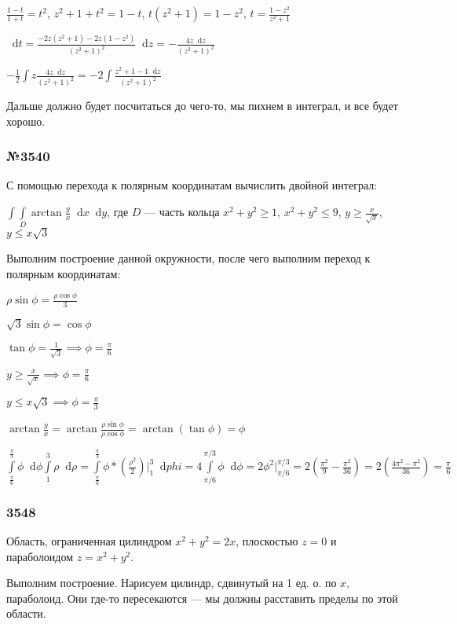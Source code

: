 \documentclass{article}
\newcommand*\diff{\mathop{}\!\mathrm{d}}
\begin{document}
$\frac{1-t}{1+t} = t^2$, $z^2 + 1 + t^2 = 1 - t$, $t(z^2 + 1) = 1 - z^2$, $t = \frac{1 - z^2}{z^2 + 1}$

$\diff t = \frac{-2z (z^2 + 1) - 2z (1 - z^2)}{(z^2 + 1)^2} \diff z = -\frac{4z \diff z}{(z^2 + 1)^2}$

$-\frac{1}{2} \int z \frac{4z \diff z}{(z^2+1)^2} = -2 \int \frac{z^2 + 1 -1 \diff z}{(z^2 + 1)^2}$

Дальше должно будет посчитаться до чего-то, мы пихнем в интеграл, и все будет хорошо.

\subsubsection{№3540}

С помощью перехода к полярным координатам вычислить двойной интеграл:

$\int\int\limits_{D} \arctan \frac{y}{x} \diff x \diff y$, где $D$ — часть кольца $x^2 + y^2 \ge 1$, $x^2 + y^2 \le 9$, $y \ge \frac{x}{\sqrt{x}}$, $y \le x\sqrt{3}$

Выполним построение данной окружности, после чего выполним переход к полярным координатам:

$\rho \sin \phi = \frac{\rho \cos \phi}{3}$

$\sqrt{3} \sin \phi = \cos \phi$

$\tan \phi = \frac{1}{\sqrt{3}} \implies \phi = \frac{\pi}{6}$

$y \ge \frac{x}{\sqrt{x}} \implies \phi = \frac{\pi}{6}$

$y \le x\sqrt{3} \implies \phi = \frac{\pi}{3}$

$\arctan \frac{y}{x} = \arctan \frac{\rho \sin \phi}{\rho \cos \phi} = \arctan (\tan \phi) = \phi$

$\int\limits_{\frac{\pi}{6}}^{\frac{\pi}{3}} \phi \diff \phi \int\limits_{1}^{3} \rho \diff \rho =
\int\limits_{\frac{\pi}{6}}^{\frac{\pi}{3}} \phi * (\frac{\rho^2}{2}) \bigg|_{1}^{3} \diff phi = 4 \int\limits_{\pi/6}^{\pi/3} \phi \diff \phi = 2 \phi^2 \bigg|_{\pi/6}^{\pi/3} = 2 (\frac{\pi^2}{9} - \frac{\pi^2}{36}) = 2 (\frac{4\pi^2 - \pi^2}{36}) = \frac{\pi}{6}$

\subsubsection{3548}

Область, ограниченная цилиндром $x^2+y^2=2x$, плоскостью $z = 0$ и параболоидом $z = x^2 + y^2$.

Выполним построение. Нарисуем цилиндр, сдвинутый на 1 ед. о. по $x$, параболоид. Они где-то пересекаются — мы должны расставить пределы по этой области.
\end{document}
